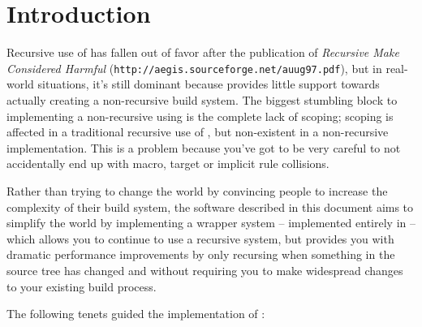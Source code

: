 \chapter{Introduction}

Recursive use of \make has fallen out of favor after the publication
of \emph{Recursive Make Considered Harmful}
(\texttt{http://aegis.sourceforge.net/auug97.pdf}), but in real-world
situations, it's still dominant because \make provides little support
towards actually creating a non-recursive build system.  The biggest
stumbling block to implementing a non-recursive using \make is the
complete lack of scoping; scoping is affected in a traditional
recursive use of \make, but non-existent in a non-recursive
implementation.  This is a problem because you've got to be very
careful to not accidentally end up with macro, target or implicit rule
collisions.

Rather than trying to change the world by convincing people to
increase the complexity of their build system, the software described
in this document aims to simplify the world by implementing a wrapper
system -- implemented entirely in \gnumake -- which allows you to
continue to use a recursive \make system, but provides you with
dramatic performance improvements by only recursing when something in
the source tree has changed and without requiring you to make
widespread changes to your existing build process.

The following tenets guided the implementation of \lmsbw:


